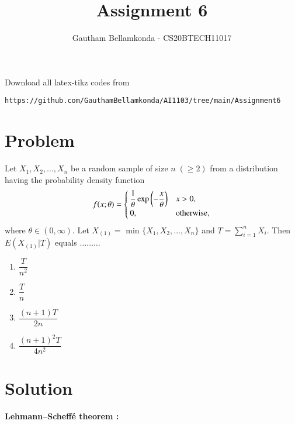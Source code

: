 \documentclass[journal,12pt,twocolumn]{IEEEtran}
\begin{document}
     \def\rightbox#1{\makebox[0in][r]{#1}}
     \def\centbox#1{\makebox[0in]{#1}}
     \def\topbox#1{\raisebox{-\baselineskip}[0in][0in]{#1}}
     \def\midbox#1{\raisebox{-0.5\baselineskip}[0in][0in]{#1}}
\vspace{3cm}
\title{Assignment 6}
\author{Gautham Bellamkonda - CS20BTECH11017}
\maketitle
\newpage
\bigskip
\renewcommand{\thefigure}{\theenumi}
\renewcommand{\thetable}{\theenumi}
Download all
latex-tikz codes from 
\begin{lstlisting}
https://github.com/GauthamBellamkonda/AI1103/tree/main/Assignment6
\end{lstlisting}
\section{Problem}
Let $X_1, X_2, \ldots , X_n$ be a random sample of size $n \; ( \geq 2 ) $ from a distribution having the probability density function
\begin{align}
f(x;\theta) = 
\begin{cases}
\dfrac{1}{\theta} \exp\left(-\dfrac{x}{\theta}\right) & x > 0, \\
0, & \text{otherwise,}
\end{cases}
\end{align}
where $\theta \in (0, \infty)$. Let $X_{(1)} = $ min $ \{ X_1, X_2, \ldots , X_n \} $ and $T = \sum_{i=1}^n X_i $. Then $E(X_{(1)} | T)$ equals $\ldots \ldots \ldots$
\begin{enumerate}[label = (\Alph*)]
\item $\dfrac{T}{n^2}$ \\
\item $\dfrac{T}{n}$ \\
\item $\dfrac{(n+1)T}{2n}$ \\
\item $\dfrac{(n+1)^2 T}{4n^2}$
\end{enumerate}

\section{Solution}
\textbf{Lehmann–Scheffé theorem :}
\end{document}
